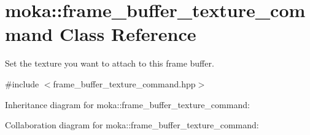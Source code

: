 \hypertarget{classmoka_1_1frame__buffer__texture__command}{}\section{moka\+::frame\+\_\+buffer\+\_\+texture\+\_\+command Class Reference}
\label{classmoka_1_1frame__buffer__texture__command}


Set the texture you want to attach to this frame buffer.  




{\ttfamily \#include $<$frame\+\_\+buffer\+\_\+texture\+\_\+command.\+hpp$>$}



Inheritance diagram for moka\+::frame\+\_\+buffer\+\_\+texture\+\_\+command\+:


Collaboration diagram for moka\+::frame\+\_\+buffer\+\_\+texture\+\_\+command\+:
